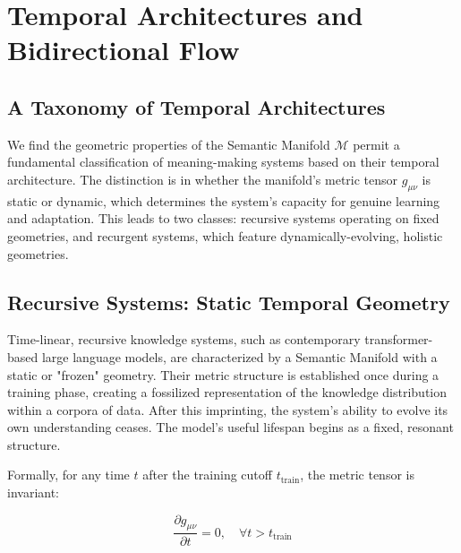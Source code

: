 \chapter{Temporal Architectures and Bidirectional Flow}
\label{9:temporal_architectures_and_bidirectional_flow}


\section{A Taxonomy of Temporal Architectures}
\label{9.1:a_taxonomy_of_temporal_architectures}

We find the geometric properties of the Semantic Manifold \(\mathcal{M}\) permit a fundamental classification of meaning-making systems based on their temporal architecture. The distinction is in whether the manifold's metric tensor \(g_{\mu\nu}\) is static or dynamic, which determines the system's capacity for genuine learning and adaptation. This leads to two classes: recursive systems operating on fixed geometries, and recurgent systems, which feature dynamically-evolving, holistic geometries.


\section{Recursive Systems: Static Temporal Geometry}
\label{9.2:recursive_systems_static_temporal_geometry}

Time-linear, recursive knowledge systems, such as contemporary transformer-based large language models, are characterized by a Semantic Manifold with a static or "frozen" geometry. Their metric structure is established once during a training phase, creating a fossilized representation of the knowledge distribution within a corpora of data. After this imprinting, the system's ability to evolve its own understanding ceases. The model's useful lifespan begins as a fixed, resonant structure.

Formally, for any time \(t\) after the training cutoff \(t_{\text{train}}\), the metric tensor is invariant:

\begin{equation}
\frac{\partial g_{\mu\nu}}{\partial t} = 0, \quad \forall t > t_{\text{train}}
\end{equation}

